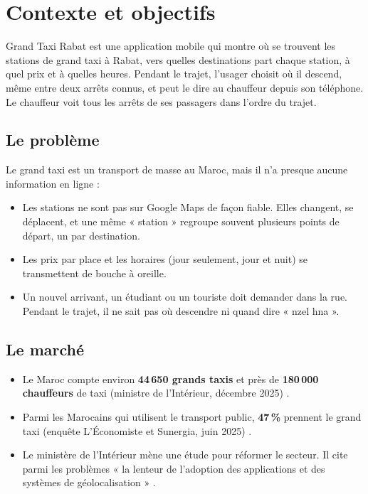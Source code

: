 \documentclass[11pt,a4paper]{article}
\begin{document}
\newpage
{\setcounter{tocdepth}{1}\tableofcontents}
\newpage

\section{Contexte et objectifs}

Grand Taxi Rabat est une application mobile qui montre où se trouvent les stations de grand taxi à Rabat, vers quelles destinations part chaque station, à quel prix et à quelles heures. Pendant le trajet, l'usager choisit où il descend, même entre deux arrêts connus, et peut le dire au chauffeur depuis son téléphone. Le chauffeur voit tous les arrêts de ses passagers dans l'ordre du trajet.

\subsection{Le problème}
Le grand taxi est un transport de masse au Maroc, mais il n'a presque aucune information en ligne :
\begin{itemize}
\item Les stations ne sont pas sur Google Maps de façon fiable. Elles changent, se déplacent, et une même « station » regroupe souvent plusieurs points de départ, un par destination.
\item Les prix par place et les horaires (jour seulement, jour et nuit) se transmettent de bouche à oreille.
\item Un nouvel arrivant, un étudiant ou un touriste doit demander dans la rue. Pendant le trajet, il ne sait pas où descendre ni quand dire « nzel hna ».
\end{itemize}

\subsection{Le marché}
\begin{itemize}
\item Le Maroc compte environ \textbf{44\,650 grands taxis} et près de \textbf{180\,000 chauffeurs} de taxi (ministre de l'Intérieur, décembre 2025) \cite{le360}.
\item Parmi les Marocains qui utilisent le transport public, \textbf{47\,\%} prennent le grand taxi (enquête L'Économiste et Sunergia, juin 2025) \cite{mwnsurvey}.
\item Le ministère de l'Intérieur mène une étude pour réformer le secteur. Il cite parmi les problèmes « la lenteur de l'adoption des applications et des systèmes de géolocalisation » \cite{allafrica}.
\end{itemize}
\end{document}
